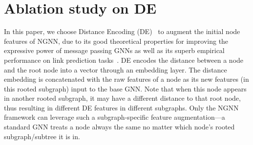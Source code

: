 \documentclass{article}
\begin{document}
\section{Ablation study on DE}\label{appendix:de}

In this paper, we choose Distance Encoding (DE)~\citep{li2020distance} to augment the initial node features of NGNN, due to its good theoretical properties for improving the expressive power of message passing GNNs as well as its superb empirical performance on link prediction tasks~\citep{zhang2018link,Zhang2020Inductive}. DE encodes the distance between a node and the root node into a vector through an embedding layer. The distance embedding is concatenated with the raw features of a node as its new features (in this rooted subgraph) input to the base GNN. Note that when this node appears in another rooted subgraph, it may have a different distance to that root node, thus resulting in different DE features in different subgraphs. Only the NGNN framework can leverage such a subgraph-specific feature augmentation---a standard GNN treats a node always the same no matter which node's rooted subgraph/subtree it is in. 
\end{document}
